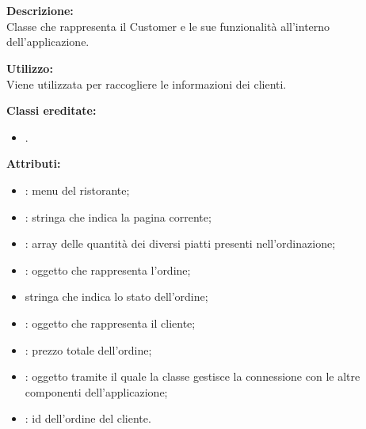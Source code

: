 \paragraph[::CustomerBubble]{\class}\mbox{}\\ \label{\class}
\textbf{Descrizione:}\\
Classe che rappresenta il Customer e le sue funzionalità all'interno dell'applicazione.

\textbf{Utilizzo:}\\
Viene utilizzata per raccogliere le informazioni dei clienti.

\textbf{Classi ereditate:}
\begin{itemize}
	\item {}.
\end{itemize}


\textbf{Attributi:}
\begin{itemize}
	\item {}: menu del ristorante;
	\item {}: stringa che indica la pagina corrente;
	\item {}: array delle quantità dei diversi piatti presenti nell'ordinazione;
	\item {}: oggetto che rappresenta l'ordine;
	\item {} stringa che indica lo stato dell'ordine;
	\item {}: oggetto che rappresenta il cliente;
	\item {}: prezzo totale dell'ordine;
	\item {}: oggetto tramite il quale la classe gestisce la connessione con le altre componenti dell'applicazione;
	\item {}: id dell'ordine del cliente.
\end{itemize}

